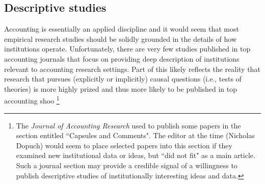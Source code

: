 \documentclass[11pt,reqno]{amsart}
\begin{document}
\begin{doublespace}


\section{Descriptive studies}

Accounting is essentially an applied discipline and it would seem that most empirical research studies should be solidly grounded in the details of how institutions operate.
Unfortunately, there are very few studies published in top accounting journals that focus on providing deep description of institutions relevant to accounting research settings.
Part of this likely reflects the reality that research that pursues (explicitly or implicitly) causal questions (i.e., tests of theories) is more highly prized and thus more likely to be published in top accounting shoo
\footnote{The \emph{Journal of Accounting Research} used to publish some papers in the section entitled ``Capsules and Comments". 
The editor at the time (Nicholas Dopuch) would seem to place selected papers into this section if they examined new institutional data or ideas, but  ``did not fit" as a main article. 
Such a journal section may provide a credible signal of a willingness to publish descriptive studies of institutionally interesting ideas and data.}


\end{doublespace}
\end{document}
